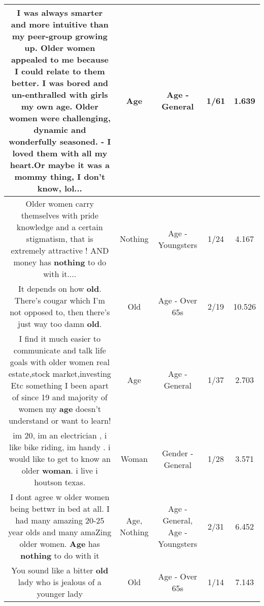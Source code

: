 \documentclass[11pt]{article}
\newlength\mylength
\begin{document}
\begin{center}
\begin{longtable}{|C{.65\mylength}|C{.30\mylength}|C{.12\mylength}|C{.12\mylength}|C{.12\mylength}|}
  \small I was always smarter and more intuitive than my peer-group growing up. Older women appealed to me  because I could relate to them better. I was bored and un-enthralled with girls my own \textbf{age}. Older women were challenging, dynamic and wonderfully seasoned. - I loved them with all my heart.Or maybe it was a mommy thing, I don't know, lol...\normalsize   & Age & Age - General & 1/61 & 1.639 \\  \hline
  \small Older women carry themselves with pride knowledge and a certain stigmatism, that is extremely attractive !  AND money has \textbf{nothing} to do with it....\normalsize   & Nothing & Age - Youngsters & 1/24 & 4.167 \\  \hline
  \small It depends on how \textbf{old}. There's cougar which I'm not opposed to, then there's just way too damn \textbf{old}.\normalsize   & Old & Age - Over 65s & 2/19 & 10.526 \\  \hline
  \small I find it much easier to communicate and talk life goals with older women real estate,stock market,investing Etc something I been apart of since 19 and majority of women my \textbf{age} doesn't understand or want to learn!\normalsize   & Age & Age - General & 1/37 & 2.703 \\  \hline
  \small im 20, im an electrician , i like bike riding, im handy . i would like to get to know an older \textbf{woman}. i live i houtson texas.\normalsize   & Woman & Gender - General & 1/28 & 3.571 \\  \hline
  \small I dont agree w older women being bettwr in bed at all. I had many amazing 20-25 year olds and many amaZing older women. \textbf{Age} has \textbf{nothing} to do with it\normalsize   & Age, Nothing & Age - General, Age - Youngsters & 2/31 & 6.452 \\  \hline
  \small You sound like a bitter \textbf{old} lady who is jealous of a younger lady\normalsize   & Old & Age - Over 65s & 1/14 & 7.143 \\  \hline

\end{longtable}
\end{center}
\end{document}
